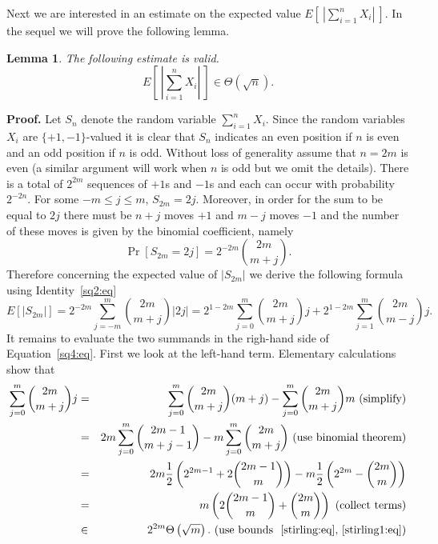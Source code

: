 \documentclass[12pt]{article}
\newtheorem{lemma}{Lemma}
\begin{document}
Next we are interested in an estimate on the expected value
$
E\left[ ~\left| \sum_{i=1}^n X_i \right| ~\right] .
$
In the sequel we will prove the following lemma. 
\begin{lemma}
\label{lm2}
The following estimate is valid.
\begin{equation}
\label{sq1:eq}
E\left[ ~\left| \sum_{i=1}^n X_i \right| ~\right] \in \Theta (\sqrt{n}) .
\end{equation}
\end{lemma}
{\bf Proof.}
Let $S_n$ denote the random variable $\sum_{i=1}^n X_i$.
Since the random variables $X_i$ are $\{ +1, -1\}$-valued
it is clear that $S_n$ indicates an even 
position if $n$ is even and an odd position if $n$ is odd.
Without loss of generality assume that $n=2m$ is even
(a similar argument will work when $n$ is odd but we omit
the details).
There is a total of $2^{2m}$ sequences of $+1$s and $-1$s
and each can occur with probability $2^{-2n}$. 
For some $-m \leq j\leq m$, 
$S_{2m} = 2j$. Moreover,
in order for the sum to be equal to $2j$ there must be
$n +j$ moves $+1$ and $m-j$ moves $-1$ and the number of these
moves is given by the binomial coefficient, namely
\begin{equation}
\label{sq2:eq}
\Pr[  S_{2m}  = 2j ] 
= 2^{-2m} {{2m} \choose {m+j}} . 
\end{equation}
Therefore concerning the expected value of $|S_{2m}|$
we derive the following formula 
using Identity~\ref{sq2:eq}
\begin{equation}
\label{sq4:eq}
E[|S_{2m}|]
= 2^{-2m} \sum_{j=-m}^{m} {{2m} \choose {m+j}} |2j|
= 2^{1-2m} \sum_{j=0}^{m} {{2m} \choose {m+j}} j 
+ 2^{1-2m} \sum_{j=1}^{m} {{2m} \choose {m-j}} j .
\end{equation}
It remains to evaluate the two summands in 
the righ-hand side of Equation~\ref{sq4:eq}.
First we look at the left-hand term. Elementary calculations
show that
\begin{eqnarray*}
\sum_{j=0}^{m} {{2m} \choose {m+j}} j 
& = & 
\sum_{j=0}^{m} {{2m} \choose {m+j}} (m+j) - 
\sum_{j=0}^{m} {{2m} \choose {m+j}} m \mbox{ (simplify)}\\
& = &
2m \sum_{j=0}^{m} {{2m-1} \choose {m+j-1}} - 
m \sum_{j=0}^{m} {{2m} \choose {m+j}} \mbox{ (use binomial theorem)}\\
& = &
2m \frac{1}{2} 
\left(
2^{2m-1} +  2 {{2m-1} \choose {m}}
\right)
- m \frac{1}{2} 
\left(
2^{2m} - {{2m} \choose m }
\right) \\
& = &
m \left( 
2 {{2m-1} \choose {m}} + {{2m} \choose m }
\right) \mbox{ (collect terms)} \\
& \in &
2^{2m}  \Theta \left( \sqrt{m} \right). 
\mbox{ (use bounds ~\ref{stirling:eq},~\ref{stirling1:eq})}
\end{eqnarray*}
\end{document}
